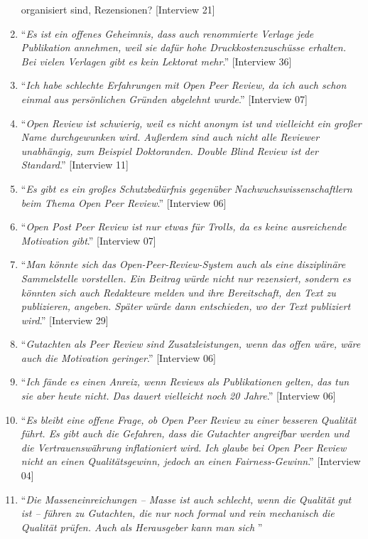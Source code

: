 \documentclass[a4paper,
fontsize=11pt,
oneside,
numbers=noperiodatend,
parskip=half-,
bibliography=totoc,
final
]{scrartcl}
\begin{document}
\begin{enumerate}
{{  organisiert sind, Rezensionen?}} {[}Interview 21{]}
\item
  \enquote{\emph{Es ist ein offenes Geheimnis, dass auch renommierte
  Verlage jede Publikation annehmen, weil sie dafür hohe
  Druckkostenzuschüsse erhalten. Bei vielen Verlagen gibt es kein
  Lektorat mehr}.} {[}Interview 36{]}
\item
  \enquote{\emph{Ich habe schlechte Erfahrungen mit Open Peer Review, da
  ich auch schon einmal aus persönlichen Gründen abgelehnt wurde}.}
  {[}Interview 07{]}
\item
   \enquote{\emph{Open Review ist schwierig, weil es nicht anonym ist und
  vielleicht ein großer Name durchgewunken wird. Außerdem sind auch
  nicht alle Reviewer unabhängig, zum Beispiel Doktoranden. Double Blind
  Review ist der Standard}.} {[}Interview 11{]}
\item
  \enquote{\emph{Es gibt es ein großes Schutzbedürfnis gegenüber
  Nachwuchswissenschaftlern beim Thema Open Peer Review}.} {[}Interview
  06{]}
\item
  \enquote{\emph{Open Post Peer Review ist nur etwas für Trolls, da es
  keine ausreichende Motivation gibt}.} {[}Interview 07{]}
\item
  \enquote{\emph{Man könnte sich das Open-Peer-Review-System auch als
  eine disziplinäre Sammelstelle vorstellen. Ein Beitrag würde nicht nur
  rezensiert, sondern es könnten sich auch Redakteure melden und ihre
  Bereitschaft, den Text zu publizieren, angeben. Später würde dann
  entschieden, wo der Text publiziert wird}.} {[}Interview 29{]}
\item
  \enquote{\emph{Gutachten als Peer Review sind Zusatzleistungen, wenn das
  offen wäre, wäre auch die Motivation geringer}.} {[}Interview 06{]}
\item
   \enquote{\emph{Ich fände es einen Anreiz, wenn Reviews als Publikationen gelten,
  das tun sie aber heute nicht. Das dauert vielleicht noch 20 Jahre}.}
  {[}Interview 06{]}
\item
  \enquote{\emph{Es bleibt eine offene Frage, ob Open Peer Review zu
  einer besseren Qualität führt. Es gibt auch die Gefahren, dass die
  Gutachter angreifbar werden und die Vertrauenswährung inflationiert
  wird. Ich glaube bei Open Peer Review nicht an einen Qualitätsgewinn,
  jedoch an einen Fairness-Gewinn}.} {[}Interview 04{]}
\item
   \enquote{\emph{Die Masseneinreichungen -- Masse ist auch schlecht, wenn die
  Qualität gut ist -- führen zu Gutachten, die nur noch formal und rein
  mechanisch die Qualität prüfen. Auch als Herausgeber kann man sich
}}
\end{enumerate}
\end{document}
